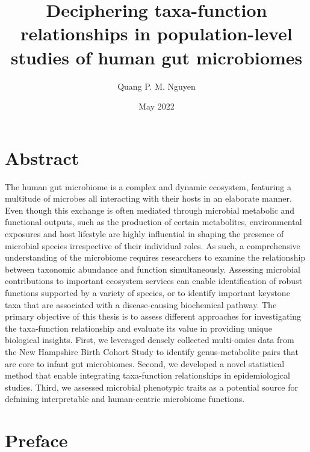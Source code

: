 \documentclass{dcthesis}
\title{Deciphering taxa-function relationships in population-level studies of human gut microbiomes}
\author{Quang P. M. Nguyen}
\date{May 2022}
\theoremstyle{definition}
\theoremstyle{remark}
\begin{document}
\frontmatter

\maketitle
\restoregeometry

\chapter*{Abstract}
The human gut microbiome is a complex and dynamic ecosystem, featuring a multitude of microbes all interacting with their hosts in an elaborate manner. Even though this exchange is often mediated through microbial metabolic and functional outputs, such as the production of certain metabolites, environmental exposures and host lifestyle are highly influential in shaping the presence of microbial species irrespective of their individual roles. As such, a comprehensive understanding of the microbiome requires researchers to examine the relationship between taxonomic abundance and function simultaneously. Assessing microbial contributions to important ecosystem services can enable identification of robust functions supported by a variety of species, or to identify important keystone taxa that are associated with a disease-causing biochemical pathway. The primary objective of this thesis is to assess different approaches for investigating the taxa-function relationship and evaluate its value in providing unique biological insights. First, we leveraged densely collected multi-omics data from the New Hampshire Birth Cohort Study to identify genus-metabolite pairs that are core to infant gut microbiomes. Second, we developed a novel statistical method that enable integrating taxa-function relationships in epidemiological studies. Third, we assessed microbial phenotypic traits as a potential source for defnining interpretable and human-centric microbiome functions. 

\chapter*{Preface}
\end{document}
